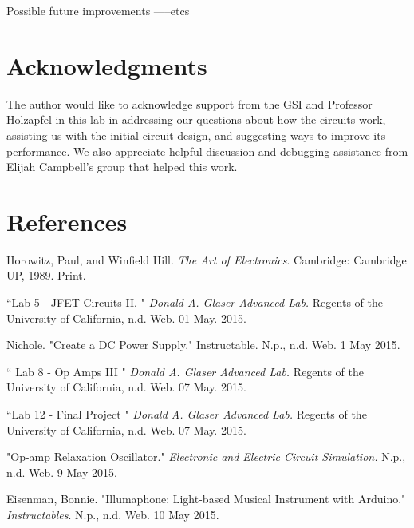 \documentclass[twocolumn]{article}
\begin{document}
Possible future improvements -----etcs
\section*{Acknowledgments}
\begin{footnotesize}
The author would like to acknowledge support from the GSI and Professor Holzapfel in this lab in addressing our questions about how the circuits work, assisting us with the initial circuit design, and suggesting ways to improve its performance.  We also appreciate helpful discussion and debugging assistance from Elijah Campbell's group that helped this work.
\end{footnotesize}
  \section*{References}
 \begin{footnotesize}
 \begin{enumerate}[ {[}1{]} ]
 \setlength\itemsep{0.001em}
 \item Horowitz, Paul, and Winfield Hill. \textit{The Art of Electronics}. Cambridge: Cambridge UP, 1989. Print.
 \item ``Lab 5 - JFET Circuits II. " \textit{Donald A. Glaser Advanced Lab.} Regents of the University of California, n.d. Web. 01 May. 2015.
 \item Nichole. "Create a DC Power Supply." Instructable. N.p., n.d. Web. 1 May 2015.
  \item `` Lab 8 - Op Amps III " \textit{Donald A. Glaser Advanced Lab.} Regents of the University of California, n.d. Web. 07 May. 2015.
  \item ``Lab 12 - Final Project " \textit{Donald A. Glaser Advanced Lab.} Regents of the University of California, n.d. Web. 07 May. 2015.
 \item "Op-amp Relaxation Oscillator." \textit{Electronic and Electric Circuit Simulation.} N.p., n.d. Web. 9 May 2015.
 \item Eisenman, Bonnie. "Illumaphone: Light-based Musical Instrument with Arduino." \textit{Instructables}. N.p., n.d. Web. 10 May 2015.
\end{enumerate}
  \end{footnotesize}
\end{document}
